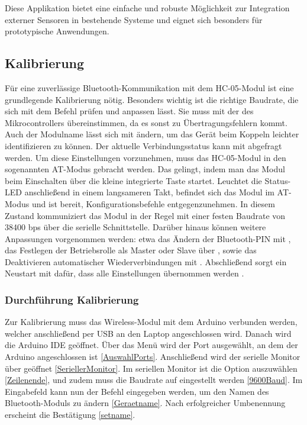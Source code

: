 Diese Applikation bietet eine einfache und robuste Möglichkeit zur Integration externer Sensoren in bestehende Systeme und eignet sich besonders für prototypische Anwendungen.

{
}


\subsection{Kalibrierung}
Für eine zuverlässige Bluetooth-Kommunikation mit dem HC-05-Modul ist eine grundlegende Kalibrierung nötig. Besonders wichtig ist die richtige Baudrate, die sich mit dem Befehl  prüfen und anpassen lässt. Sie muss mit der des Mikrocontrollers übereinstimmen, da es sonst zu Übertragungsfehlern kommt. Auch der Modulname lässt sich mit  ändern, um das Gerät beim Koppeln leichter identifizieren zu können. Der aktuelle Verbindungsstatus kann mit  abgefragt werden. Um diese Einstellungen vorzunehmen, muss das HC-05-Modul in den sogenannten AT-Modus gebracht werden. Das gelingt, indem man das Modul beim Einschalten über die kleine integrierte Taste startet. Leuchtet die Status-LED anschließend in einem langsameren Takt, befindet sich das Modul im AT-Modus und ist bereit, Konfigurationsbefehle entgegenzunehmen. In diesem Zustand kommuniziert das Modul in der Regel mit einer festen Baudrate von 38400 bps über die serielle Schnittstelle. Darüber hinaus können weitere Anpassungen vorgenommen werden: etwa das Ändern der Bluetooth-PIN mit , das Festlegen der Betriebsrolle als Master oder Slave über , sowie das Deaktivieren automatischer Wiederverbindungen mit . Abschließend sorgt ein Neustart mit  dafür, dass alle Einstellungen übernommen werden \cite{ITeadStudio:2010}. 

\subsubsection{Durchführung Kalibrierung} 
 
Zur Kalibrierung muss das Wireless-Modul mit dem Arduino verbunden werden, welcher anschließend per USB an den Laptop angeschlossen wird. Danach wird die Arduino IDE geöffnet. Über das Menü  wird der Port ausgewählt, an dem der Arduino angeschlossen ist \ref{AuswahlPorts}. Anschließend wird der serielle Monitor über  geöffnet \ref{SeriellerMonitor}. Im seriellen Monitor ist die Option  auszuwählen \ref{Zeilenende}, und zudem muss die Baudrate auf  eingestellt werden \ref{9600Baud}. Im Eingabefeld kann nun der Befehl  eingegeben werden, um den Namen des Bluetooth-Moduls zu ändern \ref{Geraetname}. Nach erfolgreicher Umbenennung erscheint die Bestätigung  \ref{setname}.


